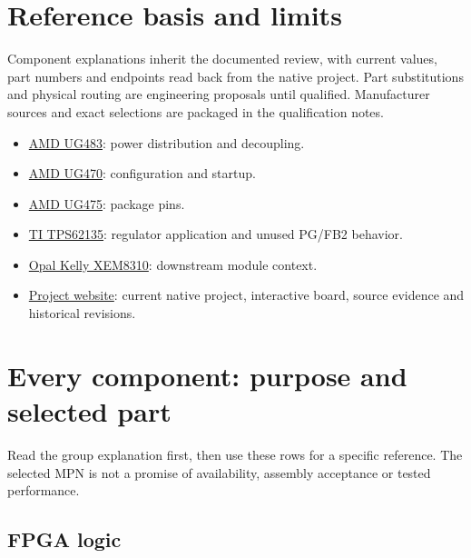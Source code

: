 \documentclass[10pt,a4paper]{article}
\begin{document}
\section{Reference basis and limits}
Component explanations inherit the documented review, with current values, part numbers and endpoints read back from the native project. Part substitutions and physical routing are engineering proposals until qualified. Manufacturer sources and exact selections are packaged in the qualification notes.
\begin{itemize}
\item \href{https://docs.amd.com/v/u/en-US/ug483_7Series_PCB}{AMD UG483}: power distribution and decoupling.
\item \href{https://docs.amd.com/v/u/en-US/ug470_7Series_Config}{AMD UG470}: configuration and startup.
\item \href{https://docs.amd.com/v/u/en-US/ug475_7Series_Pkg_Pinout}{AMD UG475}: package pins.
\item \href{https://www.ti.com/lit/ds/symlink/tps62135.pdf}{TI TPS62135}: regulator application and unused PG/FB2 behavior.
\item \href{https://www.opalkelly.com/products/fpga-integration/xem8310}{Opal Kelly XEM8310}: downstream module context.
\item \href{https://howardwhsrun.github.io/FPGA_4K/presentation/fpga/}{Project website}: current native project, interactive board, source evidence and historical revisions.
\end{itemize}
\clearpage\appendix\section{Every component: purpose and selected part}
Read the group explanation first, then use these rows for a specific reference. The selected MPN is not a promise of availability, assembly acceptance or tested performance.

\Needspace{35mm}\subsection{FPGA logic}
\end{document}
